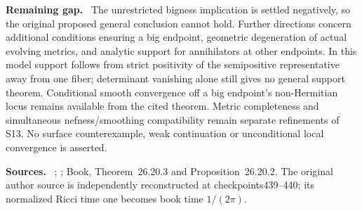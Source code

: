 \documentclass[11pt]{article}
\newcommand{\field}[1]{\par\medskip\noindent\textbf{#1.}\ }
\begin{document}
\field{Remaining gap} The unrestricted bigness implication is settled negatively, so the original proposed general conclusion cannot hold. Further directions concern additional conditions ensuring a big endpoint, geometric degeneration of actual evolving metrics, and analytic support for annihilators at other endpoints. In this model support follows from strict positivity of the semipositive representative away from one fiber; determinant vanishing alone still gives no general support theorem. Conditional smooth convergence off a big endpoint's non-Hermitian locus remains available from the cited theorem. Metric completeness and simultaneous nefness/smoothing compatibility remain separate refinements of S13. No surface counterexample, weak continuation or unconditional local convergence is asserted.
\field{Sources} \cite[Theorem 1.2 and Section 4, arXiv version]{TW15}; \cite[Theorems 1.1, A, C and 4.3]{DangNull26}; Book, Theorem~26.20.3 and Proposition~26.20.2. The original author source is independently reconstructed at checkpoints439--440; its normalized Ricci time one becomes book time $1/(2\pi)$.
\end{document}
